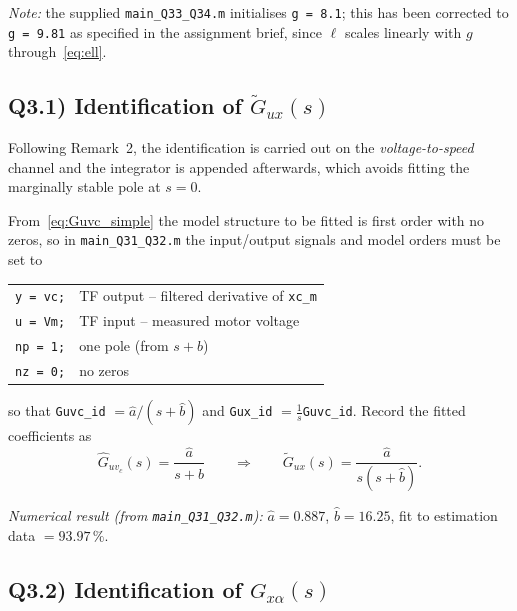 \documentclass[11pt,a4paper]{article}
\renewcommand{\l}{\ell}
\begin{document}
\textit{Note:} the supplied \texttt{main\_Q33\_Q34.m} initialises
\texttt{g = 8.1}; this has been corrected to \texttt{g = 9.81} as specified
in the assignment brief, since $\l$ scales linearly with $g$
through~\eqref{eq:ell}.

\subsection*{Q3.1) Identification of $\tilde G_{ux}(s)$}

Following Remark~2, the identification is carried out on the
\emph{voltage-to-speed} channel and the integrator is appended afterwards,
which avoids fitting the marginally stable pole at $s=0$.

From~\eqref{eq:Guvc_simple} the model structure to be fitted is first
order with no zeros, so in \texttt{main\_Q31\_Q32.m} the input/output
signals and model orders must be set to
\begin{center}
\begin{tabular}{@{}ll@{}}
\toprule
\texttt{y  = vc;}   & TF output -- filtered derivative of \texttt{xc\_m} \\
\texttt{u  = Vm;}   & TF input  -- measured motor voltage \\
\texttt{np = 1;}    & one pole (from $s+b$) \\
\texttt{nz = 0;}    & no zeros \\
\bottomrule
\end{tabular}
\end{center}
so that \texttt{Guvc\_id} $=\hat a/(s+\hat b)$ and
\texttt{Gux\_id} $=\tfrac1s$\texttt{Guvc\_id}. Record the fitted
coefficients as
\begin{equation}
\hat G_{uv_c}(s) = \frac{\hat a}{s+\hat b}
\qquad\Longrightarrow\qquad
\tilde G_{ux}(s) = \frac{\hat a}{s(s+\hat b)} .
\label{eq:id_uvc}
\end{equation}

\emph{Numerical result (from \texttt{main\_Q31\_Q32.m}):}
$\hat a = 0.887$, $\hat b = 16.25$,
fit to estimation data $=93.97\,\%$.

\subsection*{Q3.2) Identification of $G_{x\alpha}(s)$}
\end{document}
